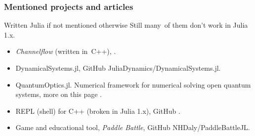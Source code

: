\documentclass[10pt,t]{beamer}
\begin{document}
\begin{frame}
  \frametitle{Mentioned projects and articles}


  {Written Julia if not mentioned otherwise}
  Still many~of them don't work in Julia 1.x.
  \begin{itemize}

  \item \textit{Channelflow} (written in~C++),
    .

  \item DynamicalSystems.jl, GitHub
    {JuliaDynamics/DynamicalSystems.jl}.

  \item QuantumOptics.jl. Numerical framework for numerical
    solving open quantum systems, more on this page
    .

  \item REPL (shell) for C++ (broken in Julia 1.x), GitHub
    .

  \item Game and educational tool, \textit{Paddle Battle}, GitHub
    {NHDaly/PaddleBattleJL}.

  \end{itemize}

\end{frame}






% 







\end{document}
